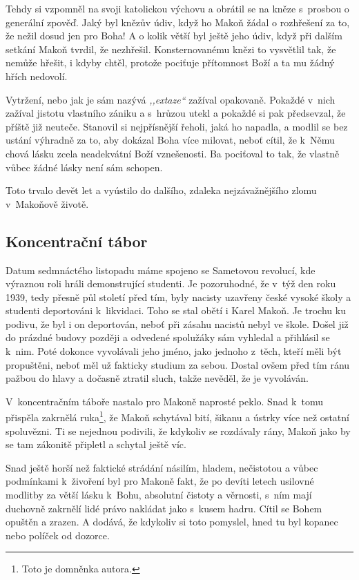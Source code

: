 Tehdy si vzpomněl na svoji katolickou výchovu a obrátil se na kněze s~prosbou o
generální zpověď. Jaký byl knězův údiv, když ho Makoň žádal o rozhřešení za to,
že nežil dosud jen pro Boha! A o kolik větší byl ještě jeho údiv, když při
dalším setkání Makoň tvrdil, že nezhřešil. Konsternovanému knězi to vysvětlil
tak, že nemůže hřešit, i kdyby chtěl, protože pociťuje přítomnost Boží a ta mu
žádný hřích nedovolí.

Vytržení, nebo jak je sám nazývá \textit{,,extaze``} zažíval opakovaně. Pokaždé
v~nich zažíval jistotu vlastního zániku a s~hrůzou utekl a pokaždé si pak
předsevzal, že příště již neuteče. Stanovil si nejpřísnější řeholi, jaká ho
napadla, a modlil se bez ustání výhradně za to, aby dokázal Boha více milovat,
neboť cítil, že k~Němu chová lásku zcela neadekvátní Boží vznešenosti. Ba
pociťoval to tak, že vlastně vůbec žádné lásky není sám schopen.

Toto trvalo devět let a vyústilo do dalšího, zdaleka nejzávažnějšího zlomu
v~Makoňově životě.

\subsection{Koncentrační tábor}

Datum sedmnáctého listopadu máme spojeno se Sametovou revolucí, kde výraznou
roli hráli demonstrující studenti. Je pozoruhodné, že v~týž den roku 1939, tedy
přesně půl století před tím, byly nacisty uzavřeny české vysoké školy a studenti
deportováni k~likvidaci. Toho se stal obětí i Karel Makoň. Je trochu ku podivu,
že byl i on deportován, neboť při zásahu nacistů nebyl ve škole. Došel již do
prázdné budovy později a odvedené spolužáky sám vyhledal a přihlásil se k~nim.
Poté dokonce vyvolávali jeho jméno, jako jednoho z~těch, kteří měli být
propuštěni, neboť měl už fakticky studium za sebou. Dostal ovšem před tím ránu
pažbou do hlavy a dočasně ztratil sluch, takže nevěděl, že je vyvoláván.

V~koncentračním táboře nastalo pro Makoně naprosté peklo. Snad k~tomu přispěla
zakrnělá ruka\footnote{Toto je domněnka autora.}, že Makoň schytával bití,
šikanu a ústrky více než ostatní spoluvězni. Ti se nejednou podivili, že
kdykoliv se rozdávaly rány, Makoň jako by se tam zákonitě připletl a schytal
ještě víc.

Snad ještě horší než faktické strádání násilím, hladem, nečistotou a vůbec
podmínkami k~živoření byl pro Makoně fakt, že po devíti letech usilovné modlitby
za větší lásku k~Bohu, absolutní čistoty a věrnosti, s~ním mají duchovně
zakrnělí lidé právo nakládat jako s~kusem hadru. Cítil se Bohem opuštěn a
zrazen. A dodává, že kdykoliv si toto pomyslel, hned tu byl kopanec nebo políček
od dozorce.

